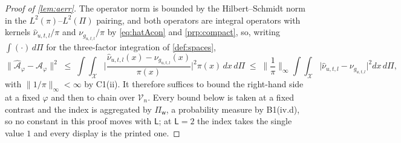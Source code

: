 \begin{proof}[Proof of \cref{lem:aerr}]
The operator norm is bounded by the Hilbert--Schmidt norm in the $L^{2}(\pi)$--$L^{2}(\Pi)$ pairing,
and both operators are integral operators with kernels $\hat\nu_{u,t,l}/\pi$ and $\nu_{g_{u,t,l}}/\pi$ by
\eqref{eq:hatAcon} and \cref{prp:compact}, so, writing $\int(\cdot)\,d\Pi$ for the three-factor
integration of \cref{def:spaces},
\begin{equation}\label{eq:hsred}
\big\|\hat{\mathcal A}_\varphi-\mathcal A_\varphi\big\|^{2}
\;\le\;\int\!\!\int_{\mathcal X}\Big|\frac{\hat\nu_{u,t,l}(x)-\nu_{g_{u,t,l}}(x)}{\pi(x)}\Big|^{2}\pi(x)\,dx\,d\Pi
\;\le\;\Big\|\frac1\pi\Big\|_\infty\!\int\!\!\int_{\mathcal X}\big|\hat\nu_{u,t,l}-\nu_{g_{u,t,l}}\big|^{2}dx\,d\Pi ,
\end{equation}
with $\|1/\pi\|_\infty<\infty$ by C1(ii). It therefore suffices to bound the right-hand side at a fixed
$\varphi$ and then to chain over $\mathcal V_n$. Every bound below is taken at a fixed contrast
and the index is aggregated by $\Pi_{\mathsf w}$, a probability measure by B1(iv.d), so no constant in
this proof moves with $\mathsf L$; at $\mathsf L=2$ the index takes the single value $1$ and every
display is the printed one.


\end{proof}
